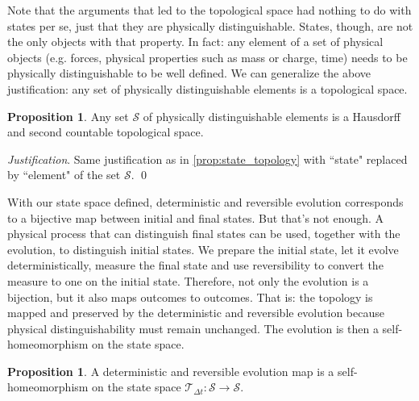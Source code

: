 \documentclass[aps,pra,10pt,twocolumn,floatfix,nofootinbib]{revtex4-1}
\numberwithin{equation}{section}
\theoremstyle{definition}
\newtheorem{prop}[equation]{Proposition}
\newenvironment{justification}{\emph{Justification}.}{\qed}
\begin{document}
Note that the arguments that led to the topological space had nothing to do with states per se, just that they are physically distinguishable. States, though, are not the only objects with that property. In fact: any element of a set of physical objects (e.g. forces, physical properties such as mass or charge, time) needs to be physically distinguishable to be well defined. We can generalize the above justification: any set of physically distinguishable elements is a topological space.

\begin{prop}\label{prop:topology}
	Any set $\mathcal{S}$ of physically distinguishable elements is a Hausdorff and second countable topological space.
\end{prop}

\begin{justification}
	Same justification as in \ref{prop:state_topology} with ``state" replaced by ``element" of the set $\mathcal{S}$.
\end{justification}

With our state space defined, deterministic and reversible evolution corresponds to a bijective map between initial and final states. But that's not enough. A physical process that can distinguish final states can be used, together with the evolution, to distinguish initial states. We prepare the initial state, let it evolve deterministically, measure the final state and use reversibility to convert the measure to one on the initial state. Therefore, not only the evolution is a bijection, but it also maps outcomes to outcomes. That is: the topology is mapped and preserved by the deterministic and reversible evolution because physical distinguishability must remain unchanged. The evolution is then a self-homeomorphism on the state space.

\begin{prop}\label{prop:homeomorphism}
A deterministic and reversible evolution map is a self-homeomorphism on the state space $\mathcal{T}_{\Delta t}:\mathcal{S} \rightarrow \mathcal{S}$.
\end{prop}
\end{document}
